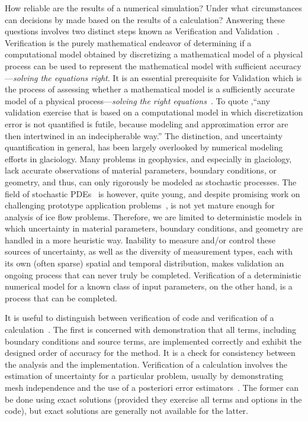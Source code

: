 How reliable are the results of a numerical simulation?
Under what circumstances can decisions by made based on the results of a calculation?
Answering these questions involves two distinct steps known as Verification and Validation~\cite{babuska2004vav,roache1998verification}.
Verification is the purely mathematical endeavor of determining if a computational model obtained by discretizing a mathematical model of a physical process can be used to represent the mathematical model with sufficient accuracy---\emph{solving the equations right}.
It is an essential prerequisite for Validation which is the process of assessing whether a mathematical model is a sufficiently accurate model of a physical process---\emph{solving the right equations}~\cite{roache1998verification}.
To quote \cite{babuska2004vav},``any validation exercise that is based on a computational model in which discretization error is not quantified is futile, because modeling and approximation error are then intertwined in an indecipherable way.''
The distinction, and uncertainty quantification in general, has been largely overlooked by numerical modeling efforts in glaciology.
Many problems in geophysics, and especially in glaciology, lack accurate observations of material parameters, boundary conditions, or geometry, and thus, can only rigorously be modeled as stochastic processes.
The field of stochastic PDEs~\cite{deb2001ssp,ghanem2003sfe,chow2007stochastic} is however, quite young, and despite promising work on challenging prototype application problems~\cite{asokan2006stochastic,ganapathysubramanian2007sgc,zabaras2008scalable,mishra2011mlmcfvm}, is not yet mature enough for analysis of ice flow problems.
Therefore, we are limited to deterministic models in which uncertainty in material parameters, boundary conditions, and geometry are handled in a more heuristic way.
Inability to measure and/or control these sources of uncertainty, as well as the diversity of measurement types, each with its own (often sparse) spatial and temporal distribution, makes validation an ongoing process that can never truly be completed.
Verification of a deterministic numerical model for a known class of input parameters, on the other hand, is a process that can be completed.

It is useful to distinguish between verification of code and verification of a calculation~\cite{roache2002cvm}.
The first is concerned with demonstration that all terms, including boundary conditions and source terms, are implemented correctly and exhibit the designed order of accuracy for the method.
It is a check for consistency between the analysis and the implementation.
Verification of a calculation involves the estimation of uncertainty for a particular problem, usually by demonstrating mesh independence and the use of a posteriori error estimators~\cite{ainsworth1997pee}.
The former can be done using exact solutions (provided they exercise all terms and options in the code), but exact solutions are generally not available for the latter.

